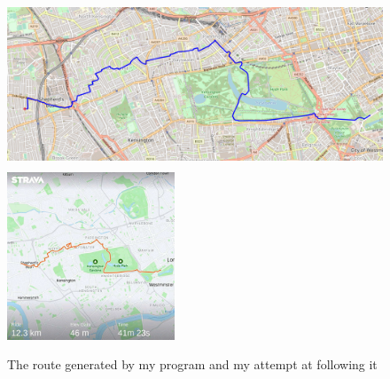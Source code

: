 \documentclass[11pt,twoside,a4paper]{report}
\begin{document}
\begin{figure}[h]
\begin{center}
\includegraphics[height=5cm]{testroutegpxsee.png}\includegraphics[height=5cm]{strava.png}
\end{center}
\caption{The route generated by my program and my attempt at following it}
\label{stravaroute}
\end{figure}
\newpage
\end{document}
